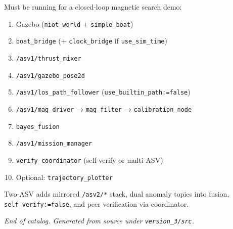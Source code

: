 Must be running for a closed-loop magnetic search demo:


\begin{enumerate}[leftmargin=*]
\item Gazebo (\texttt{niot\_world} + \texttt{simple\_boat})
\item \texttt{boat\_bridge} (+ \texttt{clock\_bridge} if \texttt{use\_sim\_time})
\item \texttt{/asv1/thrust\_mixer}
\item \texttt{/asv1/gazebo\_pose2d}
\item \texttt{/asv1/los\_path\_follower} (\texttt{use\_builtin\_path:=false})
\item \texttt{/asv1/mag\_driver} → \texttt{mag\_filter} → \texttt{calibration\_node}
\item \texttt{bayes\_fusion}
\item \texttt{/asv1/mission\_manager}
\item \texttt{verify\_coordinator} (self-verify or multi-ASV)
\item Optional: \texttt{trajectory\_plotter}
\end{enumerate}


Two-ASV adds mirrored \texttt{/asv2/*} stack, dual anomaly topics into fusion, \texttt{self\_verify:=false}, and peer verification via coordinator.




\emph{End of catalog. Generated from source under \texttt{version\_3/src}.}

